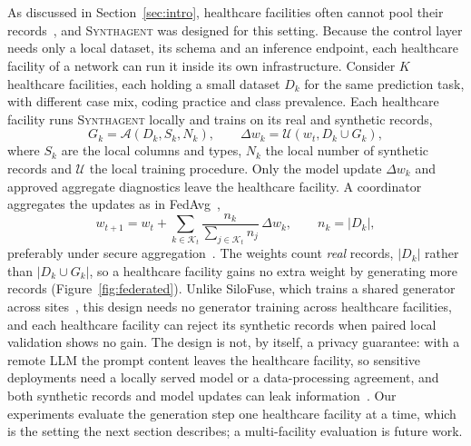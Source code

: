 \documentclass[conference]{IEEEtran}
\newcommand{\system}{\textsc{Synthagent}\xspace}
\providecommand{\DIFaddtex}[1]{{\protect\color{blue}\uwave{#1}}} %
\providecommand{\DIFaddend}{} %
\providecommand{\DIFadd}[1]{\texorpdfstring{\DIFaddtex{#1}}{#1}} %
\DeclareRobustCommand{\DIFaddend}{\DIFOaddend \let\includegraphics\DIFOincludegraphics} %
\begin{document}
\section{\DIFadd{Deployment Across Healthcare Facilities}}
\DIFaddend \label{sec:deployment}
As discussed in Section~\ref{sec:intro}, healthcare facilities often cannot pool their records~\cite{rieke2020digitalhealth,sheller2020medicine}, and \system was designed for this setting. Because the control layer needs only a local dataset, its schema and an inference endpoint, each healthcare facility of a network can run it inside its own infrastructure. Consider $K$ healthcare facilities, each holding a small dataset $D_k$ for the same prediction task, with different case mix, coding practice and class prevalence. Each healthcare facility runs \system locally and trains on its real and synthetic records,
\begin{equation}
G_k=\mathcal{A}(D_k,S_k,N_k),\qquad
\Delta w_k=\mathcal{U}(w_t,D_k\cup G_k),
\label{eq:local-federated}
\end{equation}
where $S_k$ are the local columns and types, $N_k$ the local number of synthetic records and $\mathcal{U}$ the local training procedure. Only the model update $\Delta w_k$ and approved aggregate diagnostics leave the healthcare facility. A coordinator aggregates the updates as in FedAvg~\cite{mcmahan2017fedavg,kairouz2021federated},
\begin{equation}
w_{t+1}=w_t+\sum_{k\in\mathcal{K}_t}\frac{n_k}{\sum_{j\in\mathcal{K}_t}n_j}\,\Delta w_k,\qquad n_k=|D_k|,
\label{eq:federated-aggregate}
\end{equation}
preferably under secure aggregation~\cite{bonawitz2017secure}. The weights count \emph{real} records, $|D_k|$ rather than $|D_k\cup G_k|$, so a healthcare facility gains no extra weight by generating more records (Figure~\ref{fig:federated}). Unlike SiloFuse, which trains a shared generator across sites~\cite{shankar2024silofuse}, this design needs no generator training across healthcare facilities, and each healthcare facility can reject its synthetic records when paired local validation shows no gain. The design is not, by itself, a privacy guarantee: with a remote LLM the prompt content leaves the healthcare facility, so sensitive deployments need a locally served model or a data-processing agreement, and both synthetic records and model updates can leak information~\cite{chen2024modeltrip}. Our experiments evaluate the generation step one healthcare facility at a time, which is the setting the next section describes; a multi-facility evaluation is future work.
\end{document}
